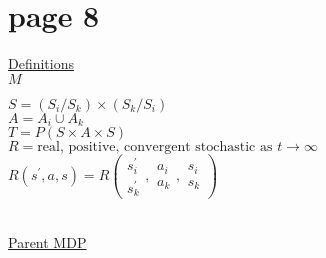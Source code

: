\section*{page 8}

\underline{Definitions}\\

\underline{$M$}\quad
\begin{minipage}[t]{5in}
$S=(S_i/S_k)\times(S_k/S_i)$\\
$A=A_i\cup A_k$\\
$T=P(S\times A\times S)$\\
$R= \text{real, positive, convergent stochastic as $t\to\infty$}$\\
$R(s^\prime,a,s) =R\left( 
\begin{array}{c} s^\prime_i \\ s^\prime_k \end{array},
\begin{array}{c} a_i \\ a_k \end{array},
\begin{array}{c} s_i \\ s_k \end{array}
\right)$
\end{minipage}\\

\underline{Parent MDP}\\


